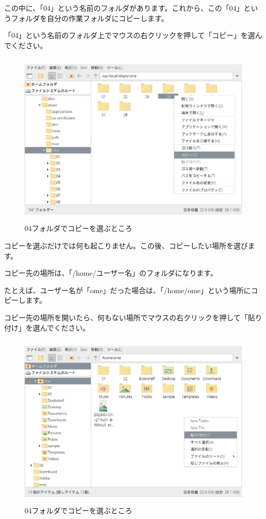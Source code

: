 この中に、「04」という名前のフォルダがあります。これから、この「04」というフォルダを自分の作業フォルダにコピーします。

「04」という名前のフォルダ上でマウスの右クリックを押して「コピー」を選んでください。


\begin{figure}[H]
  \begin{center}
    \includegraphics[keepaspectratio,width=11.232cm,height=8.424cm]{text04-img/s_ome04b.png}
    \caption{04フォルダでコピーを選ぶところ}
  \end{center}
  \label{fig:prog_menu}
\end{figure}



コピーを選ぶだけでは何も起こりません。この後、コピーしたい場所を選びます。

コピー先の場所は、「/home/ユーザー名」のフォルダになります。

たとえば、ユーザー名が「ome」だった場合は、「/home/ome」という場所にコピーします。

コピー先の場所を開いたら、何もない場所でマウスの右クリックを押して「貼り付け」を選んでください。



\begin{figure}[H]
  \begin{center}
    \includegraphics[keepaspectratio,width=11.232cm,height=8.424cm]{text04-img/s_ome04c.png}
    \caption{04フォルダでコピーを選ぶところ}
  \end{center}
  \label{fig:prog_menu}
\end{figure}


